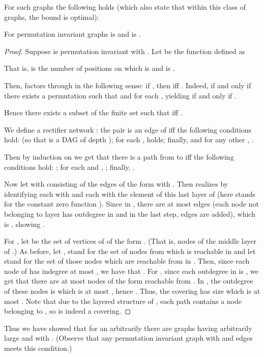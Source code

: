 \documentclass[submission]{llncs}
\begin{document}
For such graphs the following holds (which also state that within this class of graphs, the bound  is optimal):
  \begin{theorem}
  \label{thm-perm}
For permutation invariant graphs  is  and  is .
  \end{theorem}
  \begin{proof}
  Suppose  is permutation invariant with . Let  be the function defined as

That is,
   is the number of positions  on which  is  and  is .

  Then,  factors through  in the following sense: if , then  iff .
  Indeed,  if and only if there exists a permutation  such that  and
   for each , yielding  if and only if .

  Hence there exists a subset  of the finite set  such that  iff .

We define a rectifier network :
  the pair  is an edge of  iff the following conditions hold:
 (so that  is a DAG of depth ); for each ,  holds; finally,
   and for any other , .
  
  Then by induction on  we get that
  there is a path from  to
   iff the following conditions hold:
; for each  and , ; finally, .
  
  Now let  with  consisting of the edges of the form  with .
  Then  realizes  by identifying each  with  and each  with the element  of this
  last layer of  (here  stands for the constant zero function ).
  Since in , there are at most  edges (each node not belonging to layer 
  has outdegree  in  and in the last step,  edges are added), which is
  , showing .

  For , let  be the set of vertices of  of the form . (That is, nodes of the middle layer of .)
  As before, let ,  stand for the set of nodes from which  is reachable in  and let  stand
  for the set of those nodes which are reachable from  in .
  Then, since each node of  has indegree at most , we have that . For , since each outdegree in  is ,
  we get that there are at most  nodes of the form  reachable from . In , the
  outdegree of these nodes is  which is at most , hence .
  Thus, the covering  has size  which is at most
  . Note that due to the layered structure of , each  path
  contains a node belonging to , so  is indeed a covering.
  \end{proof}

  Thus we have showed that for an arbitrarily  there are graphs  having arbitrarily large  and with .
  (Observe that any permutation invariant graph with  and  edges meets this condition.)
\end{document}
